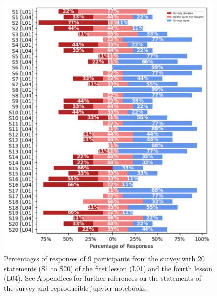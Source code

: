 \documentclass[sigconf]{acmart}
\begin{document}
\begin{figure}[t]
  \centering
    \includegraphics[width=\linewidth]{fig-results.png}  %
    \caption{
    Percentages of responses of 9 participants from the survey with 20 statements (S1 to S20) of the first lesson (L01) and the fourth lesson (L04).
    See Appendices for further references on the statements of the survey and reproducible jupyter notebooks.
    }
    \label{fig:results}
\end{figure}
\end{document}
